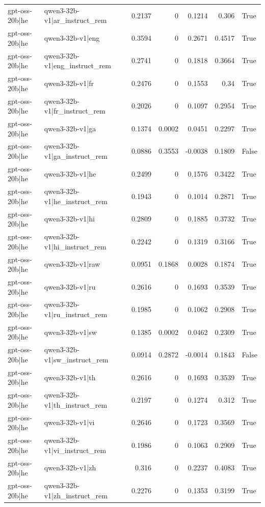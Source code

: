 \begin{table}
\begin{tabular}{l l r r r r l}
gpt-oss-20b|he & qwen3-32b-v1|ar_instruct_rem & 0.2137 & 0 & 0.1214 & 0.306 & True \\
gpt-oss-20b|he & qwen3-32b-v1|eng & 0.3594 & 0 & 0.2671 & 0.4517 & True \\
gpt-oss-20b|he & qwen3-32b-v1|eng_instruct_rem & 0.2741 & 0 & 0.1818 & 0.3664 & True \\
gpt-oss-20b|he & qwen3-32b-v1|fr & 0.2476 & 0 & 0.1553 & 0.34 & True \\
gpt-oss-20b|he & qwen3-32b-v1|fr_instruct_rem & 0.2026 & 0 & 0.1097 & 0.2954 & True \\
gpt-oss-20b|he & qwen3-32b-v1|ga & 0.1374 & 0.0002 & 0.0451 & 0.2297 & True \\
gpt-oss-20b|he & qwen3-32b-v1|ga_instruct_rem & 0.0886 & 0.3553 & -0.0038 & 0.1809 & False \\
gpt-oss-20b|he & qwen3-32b-v1|he & 0.2499 & 0 & 0.1576 & 0.3422 & True \\
gpt-oss-20b|he & qwen3-32b-v1|he_instruct_rem & 0.1943 & 0 & 0.1014 & 0.2871 & True \\
gpt-oss-20b|he & qwen3-32b-v1|hi & 0.2809 & 0 & 0.1885 & 0.3732 & True \\
gpt-oss-20b|he & qwen3-32b-v1|hi_instruct_rem & 0.2242 & 0 & 0.1319 & 0.3166 & True \\
gpt-oss-20b|he & qwen3-32b-v1|raw & 0.0951 & 0.1868 & 0.0028 & 0.1874 & True \\
gpt-oss-20b|he & qwen3-32b-v1|ru & 0.2616 & 0 & 0.1693 & 0.3539 & True \\
gpt-oss-20b|he & qwen3-32b-v1|ru_instruct_rem & 0.1985 & 0 & 0.1062 & 0.2908 & True \\
gpt-oss-20b|he & qwen3-32b-v1|sw & 0.1385 & 0.0002 & 0.0462 & 0.2309 & True \\
gpt-oss-20b|he & qwen3-32b-v1|sw_instruct_rem & 0.0914 & 0.2872 & -0.0014 & 0.1843 & False \\
gpt-oss-20b|he & qwen3-32b-v1|th & 0.2616 & 0 & 0.1693 & 0.3539 & True \\
gpt-oss-20b|he & qwen3-32b-v1|th_instruct_rem & 0.2197 & 0 & 0.1274 & 0.312 & True \\
gpt-oss-20b|he & qwen3-32b-v1|vi & 0.2646 & 0 & 0.1723 & 0.3569 & True \\
gpt-oss-20b|he & qwen3-32b-v1|vi_instruct_rem & 0.1986 & 0 & 0.1063 & 0.2909 & True \\
gpt-oss-20b|he & qwen3-32b-v1|zh & 0.316 & 0 & 0.2237 & 0.4083 & True \\
gpt-oss-20b|he & qwen3-32b-v1|zh_instruct_rem & 0.2276 & 0 & 0.1353 & 0.3199 & True \\

\end{tabular}
\end{table}
